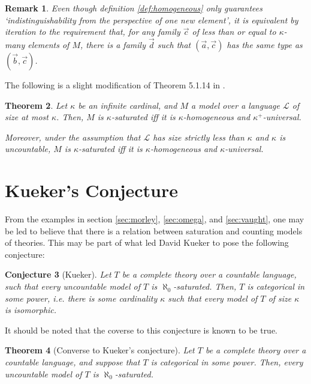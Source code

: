 \documentclass{article}
\newtheorem{theorem}{Theorem}[section]
\newtheorem{remark}[theorem]{Remark}
\newtheorem{conjecture}[theorem]{Conjecture}
\theoremstyle{nonumberplain}
\newcommand{\Lang}{\mathcal{L}}
\begin{document}
\begin{remark}
Even though definition \ref{def:homogeneous} only guarantees `indistinguishability from the perspective of one new element', it is equivalent by iteration to the requirement that, for any family $\vec c$ of less than \emph{or equal to} $\kappa$-many elements of $M$, there is a family $\vec d$ such that $(\vec a, \vec c)$ has the same type as $(\vec b, \vec c)$.
\end{remark}

The following is a slight modification of Theorem 5.1.14 in \cite{cnk}.

\begin{theorem}
Let $\kappa$ be an infinite cardinal, and $M$ a model over a language $\Lang$ of size at most $\kappa$. Then, $M$ is $\kappa$-saturated iff it is $\kappa$-homogeneous and $\kappa^+$-universal.

Moreover, under the assumption that $\Lang$ has size \emph{strictly less than} $\kappa$ and $\kappa$ is uncountable, $M$ is $\kappa$-saturated iff it is $\kappa$-homogeneous and $\kappa$-universal.
\end{theorem}

\section{Kueker's Conjecture}

From the examples in section \ref{sec:morley}, \ref{sec:omega}, and \ref{sec:vaught}, one may be led to believe that there is a relation between saturation and counting models of theories. This may be part of what led David Kueker to pose the following conjecture:

\begin{conjecture}[Kueker]
Let $T$ be a complete theory over a countable language, such that every uncountable model of $T$ is $\aleph_0$-saturated. Then, $T$ is categorical in some power, i.e. there is some cardinality $\kappa$ such that every model of $T$ of size $\kappa$ is isomorphic.
\end{conjecture}

It should be noted that the coverse to this conjecture is known to be true.

\begin{theorem}[Converse to Kueker's conjecture]
Let $T$ be a complete theory over a countable language, and suppose that $T$ is categorical in some power. Then, every uncountable model of $T$ is $\aleph_0$-saturated.
\end{theorem}
\end{document}
